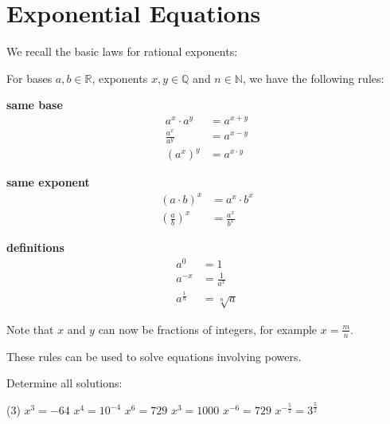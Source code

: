 \section*{Exponential Equations}
We recall the basic laws for rational exponents:
\begin{tcolorbox}
	For bases $a,b\in\mathbb R$, exponents $x,y\in\mathbb Q$ and $n\in\mathbb N$, we have the following rules:
	\begin{multicols}{3}
		\centering
		\textbf{same base}\\
		\begin{align*}
			a^x\cdot a^y&=a^{x+y} \\[10pt]
			\frac{a^x}{a^y}&=a^{x-y} \\[10pt]
			\left(a^x\right)^y&=a^{x\cdot y}
		\end{align*}
		\vfill
		\columnbreak
		
		\textbf{same exponent}\\
		\begin{align*}
			\left(a\cdot b\right)^x&=a^x\cdot b^x \\[10pt]
			\left(\frac{a}{b}\right)^x&=\frac{a^x}{b^x}
		\end{align*}
		\vfill
		\columnbreak
		
		\textbf{definitions}\\
		\begin{align*}
			a^0&=1 \\[10pt]
			a^{-x}&=\frac{1}{a^x} \\[10pt]
			a^{\frac{1}{n}}&=\sqrt[n]{a}
		\end{align*}
		\vfill
	\end{multicols}
	Note that $x$ and $y$ can now be fractions of integers, for example $x=\frac{m}{n}$.
\end{tcolorbox}
These rules can be used to solve equations involving powers.
\begin{exercise}
	Determine all solutions:
	\begin{tasks}(3)
		\task $x^3=-64$
		\task $x^4=10^{-4}$
		\task $x^6=729$
		\task $x^3=1000$
		\task $x^{-6}=729$
		\task $x^{-\frac{5}{2}}=3^{\frac{5}{2}}$
	\end{tasks}
\end{exercise}
